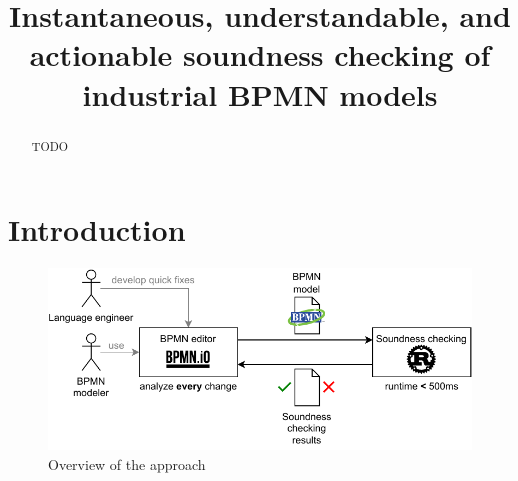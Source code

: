 \documentclass[runningheads]{llncs}
\begin{document}
%
\title{Instantaneous, understandable, and actionable soundness checking of industrial BPMN models}
%
%
%
\maketitle              %
%
\begin{abstract}
TODO
\end{abstract}


\section{Introduction}
\cite{fahlandAnalysisDemandInstantaneous2011}

\begin{figure}[ht]
	\centering
	\includegraphics[width=1\textwidth]{images/overview}
	\caption{Overview of the approach}
	\label{fig:overview}
\end{figure}
\end{document}
